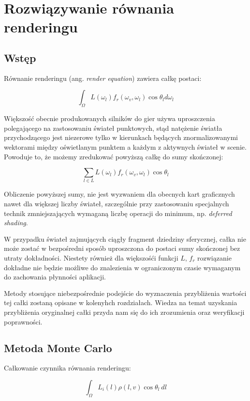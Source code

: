 \documentclass[../main.tex]{subfiles}
\begin{document}
\chapter{Rozwiązywanie równania renderingu}

\section{Wstęp}

Równanie renderingu (ang. \textit{render equation}) zawiera całkę postaci:

\[
  \int_{\Omega} {
    L(\omega_{l})
    f_r(\omega_{v}, \omega_{l})
    \cos \theta_{l}
    d\omega_{l}
  }
\]

Większość obecnie produkowanych silników do gier używa uproszczenia
polegającego na zastosowaniu świateł punktowych, stąd natężenie światła
przychodzącego jest niezerowe tylko w kierunkach będących znormalizowanymi
wektorami między oświetlanym punktem a każdym z aktywnych świateł w scenie.
Powoduje to, że możemy zredukować powyższą całkę do sumy skończonej:

\[ \sum_{l \in L} L(\omega_l) f_r(\omega_v, \omega_l)\cos \theta_l \]

Obliczenie powyższej sumy, nie jest wyzwaniem dla obecnych kart graficznych
nawet dla większej liczby świateł, szczególnie przy zastosowaniu specjalnych
technik zmniejszających wymaganą liczbę operacji do minimum, np.
\textit{deferred shading}.

W przypadku świateł zajmujących ciągły fragment dziedziny sferycznej, całka nie
może zostać w bezpośredni sposób uproszczona do postaci sumy skończonej bez
utraty dokładności. Niestety również dla większośći funkcji $L$, $f_r$
rozwiązanie dokładne nie będzie możliwe do znalezienia w ograniczonym czasie
wymaganym do zachowania płynności aplikacji.

Metody stosujące niebezpośrednie podejście do wyznaczenia przybliżenia wartości
tej całki zostaną opisane w kolenyhch rozdziałach. Wiedza na temat uzyskania
przybliżenia oryginalnej całki przyda nam się do ich zrozumienia oraz
weryfikacji poprawności.

\section{Metoda Monte Carlo}

Całkowanie czynnika równania renderingu:

$$
\int_{\Omega} {
    L_i(l)
    \rho(l,v)
    \cos \theta_{l}
    \: dl
} $$
\end{document}
